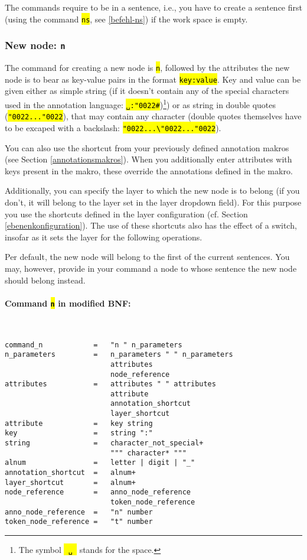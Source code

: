 \documentclass[12pt]{scrartcl}
\newcommand{\quo}{\char"0022}
\newcommand{\code}[1]{\hl{\texttt{#1}}}
\begin{document}
The commands require to be in a sentence, i.e., you have to create a sentence first (using the command \code{ns}, see \ref{befehl-ns}) if the work space is empty.


\subsubsection{New node: \texttt{n}}\label{befehl-n}

The command for creating a new node is \code{n}, followed by the attributes the new node is to bear as key-value pairs in the format \code{key:value}.
Key and value can be given either as simple string (if it doesn’t contain any of the special characters used in the annotation language: \code{␣:\quo\#})\footnote{The symbol \code{\mbox{\,␣\,}} stands for the space.}) or as string in double quotes (\code{\quo...\quo}), that may contain any character (double quotes themselves have to be excaped with a backslash: \code{\quo...\textbackslash\quo...\quo}).

You can also use the shortcut from your previously defined annotation makros (see Section \ref{annotationsmakros}).
When you additionally enter attributes with keys present in the makro, these override the annotations defined in the makro.

Additionally, you can specify the layer to which the new node is to belong (if you don’t, it will belong to the layer set in the layer dropdown field).
For this purpose you use the shortcuts defined in the layer configuration (cf. Section \ref{ebenenkonfiguration}).
The use of these shortcuts also has the effect of a switch, insofar as it sets the layer for the following operations.

Per default, the new node will belong to the first of the current sentences.
You may, however, provide in your command a node to whose sentence the new node should belong instead.

\paragraph*{Command \code{n} in modified BNF:}
~
\begin{lstlisting}
command_n            =   "n " n_parameters
n_parameters         =   n_parameters " " n_parameters
                         attributes
                         node_reference
attributes           =   attributes " " attributes
                         attribute
                         annotation_shortcut
                         layer_shortcut
attribute            =   key string
key                  =   string ":"
string               =   character_not_special+
                         """ character* """
alnum                =   letter | digit | "_"
annotation_shortcut  =   alnum+
layer_shortcut       =   alnum+
node_reference       =   anno_node_reference
                         token_node_reference
anno_node_reference  =   "n" number
token_node_reference =   "t" number
\end{lstlisting}
\end{document}
